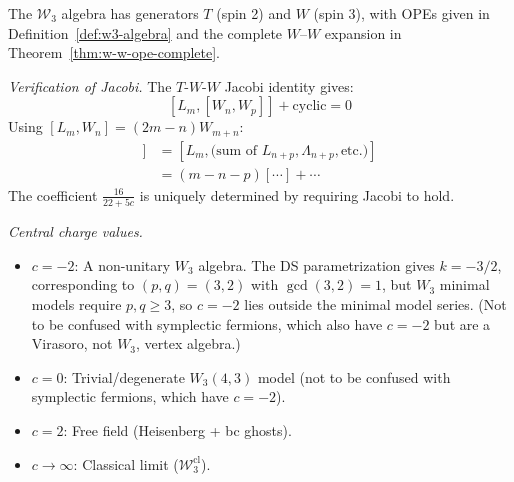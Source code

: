 \begin{computation}\label{comp:w3-coeff}
The $\mathcal{W}_3$ algebra has generators $T$ (spin 2) and $W$ (spin 3), with OPEs given in Definition~\ref{def:w3-algebra} and the complete $W$--$W$ expansion in Theorem~\ref{thm:w-w-ope-complete}.

\emph{Verification of Jacobi.} The $T$-$W$-$W$ Jacobi identity gives:
\[
[L_m, [W_n, W_p]] + \text{cyclic} = 0
\]
Using $[L_m, W_n] = (2m - n)W_{m+n}$:
\begin{align*}
[L_m, [W_n, W_p]] &= [L_m, \text{(sum of } L_{n+p}, \Lambda_{n+p}, \text{etc.)}] \\
&= (m - n - p)[\cdots] + \cdots
\end{align*}
The coefficient $\frac{16}{22+5c}$ is uniquely determined by requiring Jacobi to hold.

\emph{Central charge values.}
\begin{itemize}
\item $c = -2$: A non-unitary $W_3$ algebra.  The DS parametrization gives $k = -3/2$, corresponding to $(p,q) = (3,2)$ with $\gcd(3,2) = 1$, but $W_3$ minimal models require $p, q \geq 3$, so $c = -2$ lies outside the minimal model series.  (Not to be confused with symplectic fermions, which also have $c=-2$ but are a Virasoro, not $W_3$, vertex algebra.)
\item $c = 0$: Trivial/degenerate $W_3(4,3)$ model (not to be confused with symplectic fermions, which have $c=-2$).
\item $c = 2$: Free field (Heisenberg + bc ghosts).
\item $c \to \infty$: Classical limit ($\mathcal{W}_3^{\mathrm{cl}}$).
\end{itemize}
\end{computation}



